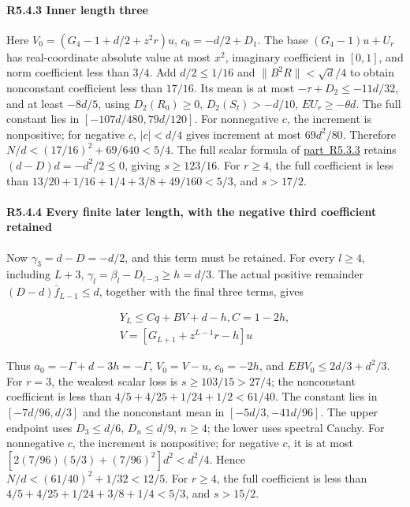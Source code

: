 \paragraph{R5.4.3 Inner length three}

Here \(V_0=(G_4-1+d/2+z^2r)u\), \(c_0=-d/2+D_1\). The base \((G_4-1)u+U_r\) has real-coordinate absolute value at most \(x^2\), imaginary coefficient in \([0,\allowbreak \allowbreak  1]\), and norm coefficient less than \(3/4\). Add \(d/2\le1/16\) and \(\|B^2R\|<\sqrt d/4\) to obtain nonconstant coefficient less than \(17/16\). Its mean is at most \(-\tau+D_2\le-11d/32\), and at least \(-8d/5\), using \(D_2(R_0)\ge0\), \(D_2(S_t)>-d/10\), \(EU_r\ge-\theta d\). The full constant lies in \([-107d/480,\allowbreak \allowbreak  79d/120]\). For nonnegative \(c\), the increment is nonpositive; for negative \(c\), \(|c|<d/4\) gives increment at most \(69d^2/80\). Therefore \(N/d<(17/16)^2+69/640<5/4\). The full scalar formula of \mbox{\hyperref[part:R5.3.3]{part R5.3.3}} retains \((d-D)d=-d^2/2\le0\), giving \(s\ge123/16\). For \(r\ge4\), the full coefficient is less than \(13/20+1/16+1/4+3/8+49/160<5/3\), and \(s>17/2\).

\paragraph{R5.4.4 Every finite later length, with the negative third coefficient retained}

Now \(\gamma_3=d-D=-d/2\), and this term must be retained. For every \(l\ge4\), including \(L+3\), \(\gamma_l=\beta_l-D_{l-3}\ge h=d/3\). The actual positive remainder \((D-d)\bar f_{L-1}\le d\), together with the final three terms, gives

\[
\begin{gathered}
Y_L\le Cq+BV+d-h,C=1-2h,\\
V=[G_{L+1}+z^{L-1}r-h]u
\end{gathered}
\]

Thus \(a_0=-\Gamma+d-3h=-\Gamma\), \(V_0=V-u\), \(c_0=-2h\), and \(EBV_0\le2d/3+d^2/3\). For \(r=3\), the weakest scalar loss is \(s\ge103/15>27/4\); the nonconstant coefficient is less than \(4/5+4/25+1/24+1/2<61/40\). The constant lies in \([-7d/96,\allowbreak \allowbreak  d/3]\) and the nonconstant mean in \([-5d/3,\allowbreak \allowbreak -41d/96]\). The upper endpoint uses \(D_3\le d/6\), \(D_n\le d/9\), \(n\ge4\); the lower uses spectral Cauchy. For nonnegative \(c\), the increment is nonpositive; for negative \(c\), it is at most \([2(7/96)(5/3)+(7/96)^2]d^2<d^2/4\). Hence \(N/d<(61/40)^2+1/32<12/5\). For \(r\ge4\), the full coefficient is less than \(4/5+4/25+1/24+3/8+1/4<5/3\), and \(s>15/2\).

